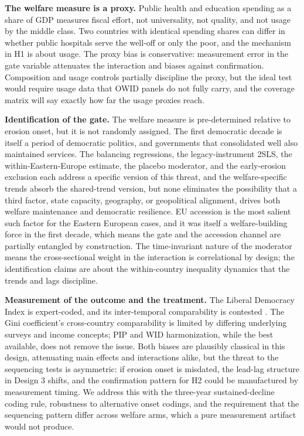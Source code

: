 \textbf{The welfare measure is a proxy.} Public health and education spending as a share of GDP measures fiscal effort, not universality, not quality, and not usage by the middle class. Two countries with identical spending shares can differ in whether public hospitals serve the well-off or only the poor, and the mechanism in H1 is about usage. The proxy bias is conservative: measurement error in the gate variable attenuates the interaction and biases against confirmation. Composition and usage controls partially discipline the proxy, but the ideal test would require usage data that OWID panels do not fully carry, and the coverage matrix will say exactly how far the usage proxies reach.

\textbf{Identification of the gate.} The welfare measure is pre-determined relative to erosion onset, but it is not randomly assigned. The first democratic decade is itself a period of democratic politics, and governments that consolidated well also maintained services. The balancing regressions, the legacy-instrument 2SLS, the within-Eastern-Europe estimate, the placebo moderator, and the early-erosion exclusion each address a specific version of this threat, and the welfare-specific trends absorb the shared-trend version, but none eliminates the possibility that a third factor, state capacity, geography, or geopolitical alignment, drives both welfare maintenance and democratic resilience. EU accession is the most salient such factor for the Eastern European cases, and it was itself a welfare-building force in the first decade, which means the gate and the accession channel are partially entangled by construction. The time-invariant nature of the moderator means the cross-sectional weight in the interaction is correlational by design; the identification claims are about the within-country inequality dynamics that the trends and lags discipline.

\textbf{Measurement of the outcome and the treatment.} The Liberal Democracy Index is expert-coded, and its inter-temporal comparability is contested \citep{WaldnerLust2018}. The Gini coefficient's cross-country comparability is limited by differing underlying surveys and income concepts; PIP and WID harmonization, while the best available, does not remove the issue. Both biases are plausibly classical in this design, attenuating main effects and interactions alike, but the threat to the sequencing tests is asymmetric: if erosion onset is misdated, the lead-lag structure in Design 3 shifts, and the confirmation pattern for H2 could be manufactured by measurement timing. We address this with the three-year sustained-decline coding rule, robustness to alternative onset codings, and the requirement that the sequencing pattern differ across welfare arms, which a pure measurement artifact would not produce.

